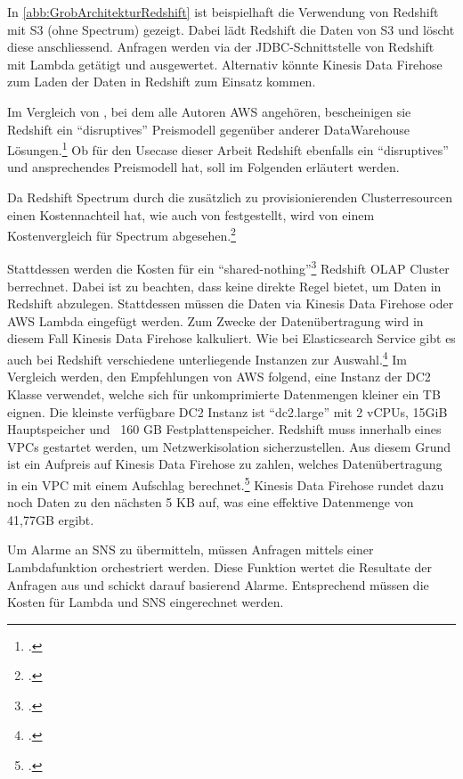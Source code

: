 In \autoref{abb:GrobArchitekturRedshift} ist beispielhaft die Verwendung von Redshift mit \ac{S3} (ohne Spectrum) gezeigt. Dabei lädt Redshift die Daten von \ac{S3} und löscht diese anschliessend. Anfragen werden via der \ac{JDBC}-Schnittstelle von Redshift mit Lambda getätigt und ausgewertet. Alternativ könnte Kinesis Data Firehose zum Laden der Daten in Redshift zum Einsatz kommen.


Im Vergleich von \citeauthor{Gupta.2015}, bei dem alle Autoren \ac{AWS} angehören, bescheinigen sie Redshift ein \enquote{disruptives} Preismodell gegenüber anderer DataWarehouse Lösungen.\footcite[Vgl.][]{Gupta.2015} Ob für den Usecase dieser Arbeit Redshift ebenfalls ein \enquote{disruptives} und ansprechendes Preismodell hat, soll im Folgenden erläutert werden.

Da Redshift Spectrum durch die zusätzlich zu provisionierenden Clusterresourcen einen Kostennachteil hat, wie auch von \citeauthor{Tan.2019} festgestellt, wird von einem Kostenvergleich für Spectrum abgesehen.\footcite[Vgl.][2178]{Tan.2019}

Stattdessen werden die Kosten für ein \enquote{shared-nothing}\footcite[Vgl.][2172]{Tan.2019} Redshift \ac{OLAP} Cluster berrechnet. Dabei ist zu beachten, dass \AWSIOT{} keine direkte Regel bietet, um Daten in Redshift abzulegen. Stattdessen müssen die Daten via Kinesis Data Firehose oder \ac{AWS} Lambda eingefügt werden. Zum Zwecke der Datenübertragung wird in diesem Fall Kinesis Data Firehose kalkuliert. Wie bei Elasticsearch Service gibt es auch bei Redshift verschiedene unterliegende Instanzen zur Auswahl.\footcite[Vgl. auch im Folgenden][]{AmazonWebServicesInc..o.J.z} Im Vergleich werden, den Empfehlungen von \ac{AWS} folgend, eine Instanz der \ac{DC2} Klasse verwendet, welche sich für unkomprimierte Datenmengen kleiner ein TB eignen. Die kleinste verfügbare \ac{DC2} Instanz ist \enquote{dc2.large} mit 2 vCPUs, 15GiB Hauptspeicher und ~160 GB Festplattenspeicher. Redshift muss innerhalb eines \acp{VPC} gestartet werden, um Netzwerkisolation sicherzustellen. Aus diesem Grund ist ein Aufpreis auf Kinesis Data Firehose zu zahlen, welches Datenübertragung in ein \ac{VPC} mit einem Aufschlag berechnet.\footcite[Vgl. auch im Folgenden][]{AmazonWebServicesInc..o.J.y} Kinesis Data Firehose rundet dazu noch Daten zu den nächsten 5 KB auf, was eine effektive Datenmenge von 41,77GB ergibt.

Um Alarme an \ac{SNS} zu übermitteln, müssen Anfragen mittels einer Lambdafunktion orchestriert werden. Diese Funktion wertet die Resultate der Anfragen aus und schickt darauf basierend Alarme. Entsprechend müssen die Kosten für Lambda und \ac{SNS} eingerechnet werden.

